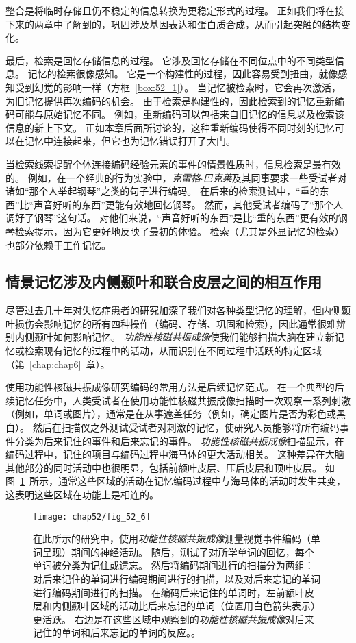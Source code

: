 整合是将临时存储且仍不稳定的信息转换为更稳定形式的过程。
正如我们将在接下来的两章中了解到的，巩固涉及基因表达和蛋白质合成，从而引起突触的结构变化。


最后，检索是回忆存储信息的过程。
它涉及回忆存储在不同位点中的不同类型信息。
记忆的检索很像感知。
它是一个构建性的过程，因此容易受到扭曲，就像感知受到幻觉的影响一样（方框~\ref{box:52_1}）。
当记忆被检索时，它会再次激活，为旧记忆提供再次编码的机会。
由于检索是构建性的，因此检索到的记忆重新编码可能与原始记忆不同。
例如，重新编码可以包括来自旧记忆的信息以及检索该信息的新上下文。
正如本章后面所讨论的，这种重新编码使得不同时刻的记忆可以在记忆中连接起来，但它也为记忆错误打开了大门。


当检索线索提醒个体连接编码经验元素的事件的情景性质时，信息检索是最有效的。
例如，在一个经典的行为实验中，\textit{克雷格$\cdot$巴克莱}及其同事要求一些受试者对诸如“那个人举起钢琴”之类的句子进行编码。
在后来的检索测试中，“重的东西”比“声音好听的东西”更能有效地回忆钢琴。
然而，其他受试者编码了“那个人调好了钢琴”这句话。
对他们来说，“声音好听的东西”是比“重的东西”更有效的钢琴检索提示，因为它更好地反映了最初的体验。
检索（尤其是外显记忆的检索）也部分依赖于工作记忆。



\subsection{情景记忆涉及内侧颞叶和联合皮层之间的相互作用}

尽管过去几十年对失忆症患者的研究加深了我们对各种类型记忆的理解，但内侧颞叶损伤会影响记忆的所有四种操作（编码、存储、巩固和检索），因此通常很难辨别内侧颞叶如何影响记忆。
\textit{功能性核磁共振成像}使我们能够扫描大脑在建立新记忆或检索现有记忆的过程中的活动，从而识别在不同过程中活跃的特定区域（第~\ref{chap:chap6}~章）。


使用功能性核磁共振成像研究编码的常用方法是后续记忆范式。
在一个典型的后续记忆任务中，人类受试者在使用功能性核磁共振成像扫描时一次观察一系列刺激（例如，单词或图片），通常是在从事遮盖任务（例如，确定图片是否为彩色或黑白）。
然后在扫描仪之外测试受试者对刺激的记忆，使研究人员能够将所有编码事件分类为后来记住的事件和后来忘记的事件。
\textit{功能性核磁共振成像}扫描显示，在编码过程中，记住的项目与编码过程中海马体的更大活动相关。
这种差异在大脑其他部分的同时活动中也很明显，包括前额叶皮层、压后皮层和顶叶皮层。
如图~\ref{fig:52_6}~所示，通常这些区域的活动在记忆编码过程中与海马体的活动时发生共变，这表明这些区域在功能上是相连的。


\begin{figure}[htbp]
	\centering
	\texttt{[image: chap52/fig\_52\_6]}
	\caption{在此所示的研究中，使用\textit{功能性核磁共振成像}测量视觉事件编码（单词呈现）期间的神经活动。
		随后，测试了对所学单词的回忆，每个单词被分类为记住或遗忘。
		然后将编码期间进行的扫描分为两组：对后来记住的单词进行编码期间进行的扫描，以及对后来忘记的单词进行编码期间进行的扫描。
		在编码后来记住的单词时，左前额叶皮层和内侧颞叶区域的活动比后来忘记的单词（位置用白色箭头表示）更活跃。
		右边是在这些区域中观察到的\textit{功能性核磁共振成像}对后来记住的单词和后来忘记的单词的反应。\cite{wagner1998building}。}
	\label{fig:52_6}
\end{figure}


